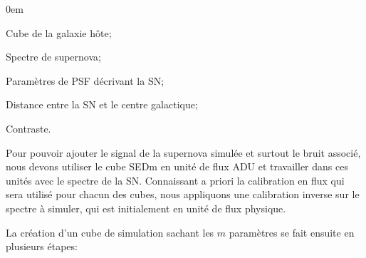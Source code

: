 \documentclass[../main/main.tex]{subfiles}
\begin{document}
\begin{itemize}[label=$\diamondsuit$]
  \itemsep0em
 \begin{samepage}
\item Cube de la galaxie hôte;
\item Spectre de supernova;
\item Paramètres de PSF décrivant la SN;
\item Distance entre la SN et le centre galactique;
\item  Contraste.
  \end{samepage}
\end{itemize}

Pour pouvoir ajouter le signal de la supernova simulée et surtout le
bruit associé, nous devons utiliser le cube SEDm en unité de flux
ADU et travailler dans ces unités avec le spectre de la SN.
Connaissant a priori la calibration en flux qui sera utilisé pour chacun des
cubes, nous appliquons une calibration inverse sur le spectre à simuler,
qui est initialement en unité de flux physique.

La création d'un cube de simulation sachant les $m$ paramètres se fait ensuite en plusieurs étapes:
\end{document}
